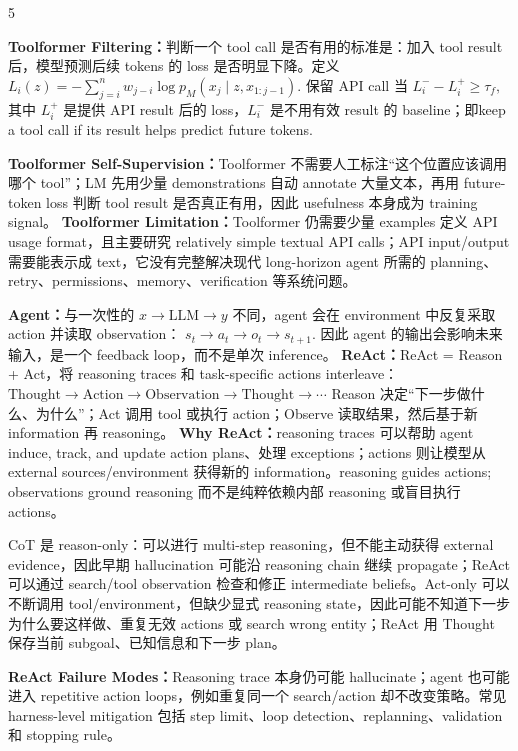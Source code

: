\documentclass[a4paper, landscape]{article}
\begin{document}
\begin{multicols}{5}
\par \textbf{Toolformer Filtering：}判断一个 tool call 是否有用的标准是：加入 tool result 后，模型预测后续 tokens 的 loss 是否明显下降。定义
\(
L_i(z)=-\sum_{j=i}^{n}w_{j-i}\log p_M(x_j\mid z,x_{1:j-1}).
\)
保留 API call 当
\(
L_i^- - L_i^+ \ge \tau_f,
\)
其中 \(L_i^+\) 是提供 API result 后的 loss，\(L_i^-\) 是不用有效 result 的 baseline；即keep a tool call if its result helps predict future tokens.

\par \textbf{Toolformer Self-Supervision：}Toolformer 不需要人工标注“这个位置应该调用哪个 tool”；LM 先用少量 demonstrations 自动 annotate 大量文本，再用 future-token loss 判断 tool result 是否真正有用，因此 usefulness 本身成为 training signal。
\textbf{Toolformer Limitation：}Toolformer 仍需要少量 examples 定义 API usage format，且主要研究 relatively simple textual API calls；API input/output 需要能表示成 text，它没有完整解决现代 long-horizon agent 所需的 planning、retry、permissions、memory、verification 等系统问题。

\par \textbf{Agent：}与一次性的
\(
x\rightarrow \mathrm{LLM}\rightarrow y
\)
不同，agent 会在 environment 中反复采取 action 并读取 observation：
\(
s_t\rightarrow a_t\rightarrow o_t\rightarrow s_{t+1}.
\)
因此 agent 的输出会影响未来输入，是一个 feedback loop，而不是单次 inference。
\textbf{ReAct：}ReAct = Reason + Act，将 reasoning traces 和 task-specific actions interleave：
\(
\text{Thought}\rightarrow\text{Action}\rightarrow\text{Observation}\rightarrow\text{Thought}\rightarrow\cdots
\)
Reason 决定“下一步做什么、为什么”；Act 调用 tool 或执行 action；Observe 读取结果，然后基于新 information 再 reasoning。
\textbf{Why ReAct：}reasoning traces 可以帮助 agent induce, track, and update action plans、处理 exceptions；actions 则让模型从 external sources/environment 获得新的 information。reasoning guides actions; observations ground reasoning
而不是纯粹依赖内部 reasoning 或盲目执行 actions。

CoT 是 reason-only：可以进行 multi-step reasoning，但不能主动获得 external evidence，因此早期 hallucination 可能沿 reasoning chain 继续 propagate；ReAct 可以通过 search/tool observation 检查和修正 intermediate beliefs。Act-only 可以不断调用 tool/environment，但缺少显式 reasoning state，因此可能不知道下一步为什么要这样做、重复无效 actions 或 search wrong entity；ReAct 用 Thought 保存当前 subgoal、已知信息和下一步 plan。

\par \textbf{ReAct Failure Modes：}Reasoning trace 本身仍可能 hallucinate；agent 也可能进入 repetitive action loops，例如重复同一个 search/action 却不改变策略。常见 harness-level mitigation 包括 step limit、loop detection、replanning、validation 和 stopping rule。


\end{multicols}
\end{document}
